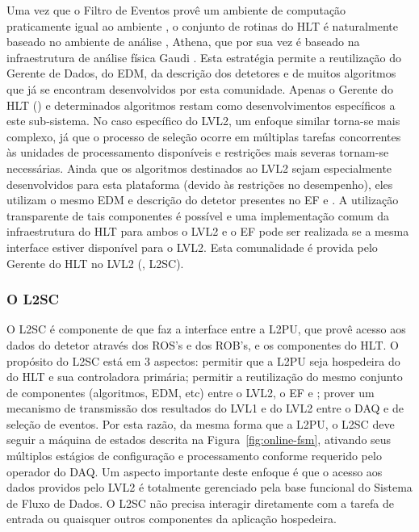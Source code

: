 Uma vez que o Filtro de Eventos provê um ambiente de computação praticamente
igual ao ambiente , o conjunto de rotinas do HLT é naturalmente
baseado no ambiente de análise , Athena, que por sua vez é
baseado na infraestrutura de análise física Gaudi \cite{athena:home-page,
athena:devel-guide}. Esta estratégia permite a reutilização do Gerente de
Dados, do EDM, da descrição dos detetores e de muitos algoritmos que já se
encontram desenvolvidos por esta comunidade. Apenas o Gerente do HLT
() e determinados algoritmos restam como desenvolvimentos
específicos a este sub-sistema. No caso específico do LVL2, um enfoque similar
torna-se mais complexo, já que o processo de seleção ocorre em múltiplas
tarefas concorrentes às unidades de processamento disponíveis e restrições
mais severas tornam-se necessárias. Ainda que os algoritmos destinados ao LVL2
sejam especialmente desenvolvidos para esta plataforma (devido às restrições
no desempenho), eles utilizam o mesmo EDM e descrição do detetor presentes no
EF e . A utilização transparente de tais componentes é possível e
uma implementação comum da infraestrutura do HLT para ambos o LVL2 e o EF pode
ser realizada se a mesma interface estiver disponível para o LVL2. Esta
comunalidade é provida pelo Gerente do HLT no LVL2 (, L2SC).

\subsubsection{O L2SC}

O L2SC é componente de  que faz a interface entre a L2PU, que
provê acesso aos dados do detetor através dos ROS's e dos ROB's, e os
componentes do HLT. O propósito do L2SC está em 3 aspectos: permitir que a
L2PU seja hospedeira do  do HLT e sua controladora primária;
permitir a reutilização do mesmo conjunto de componentes (algoritmos, EDM,
etc) entre o LVL2, o EF e ; prover um mecanismo de transmissão
dos resultados do LVL1 e do LVL2 entre o DAQ e  de seleção de
eventos. Por esta razão, da mesma forma que a L2PU, o L2SC deve seguir a
máquina de estados descrita na Figura~\ref{fig:online-fsm}, ativando seus
múltiplos estágios de configuração e processamento conforme requerido pelo
operador do DAQ. Um aspecto importante deste enfoque é que o acesso aos dados
providos pelo LVL2 é totalmente gerenciado pela base funcional do Sistema de
Fluxo de Dados. O L2SC não precisa interagir diretamente com a tarefa de
entrada ou quaisquer outros componentes da aplicação hospedeira.


